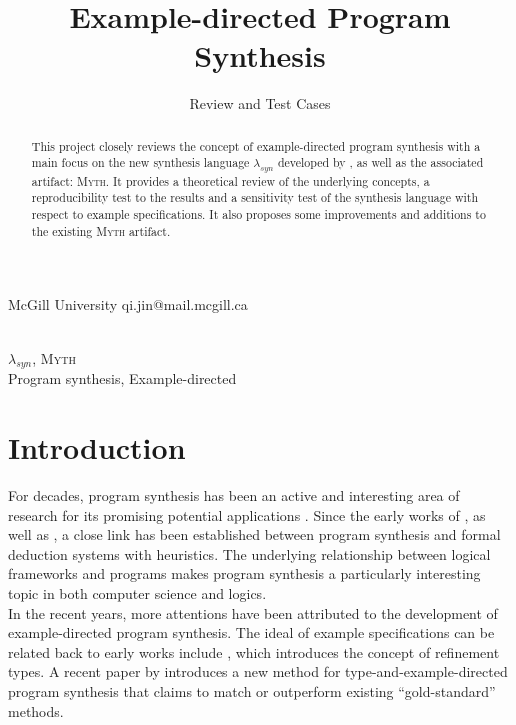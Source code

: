 \documentclass[preprint, 11pt]{sigplanconf}
\begin{document}
\setlength{\pdfpageheight}{\paperheight}
\setlength{\pdfpagewidth}{\paperwidth}



\title{Example-directed Program Synthesis}
\subtitle{Review and Test Cases}

           {McGill University}
           {qi.jin@mail.mcgill.ca}

\maketitle

\begin{abstract}
This project closely reviews the concept of example-directed program synthesis with a main focus on the new synthesis language $\lambda_{syn}$ developed by \citet{osera2015type}, as well as the associated artifact: \textsc{Myth}. It provides a theoretical review of the underlying concepts, a reproducibility test to the results and a sensitivity test of the synthesis language with respect to example specifications. It also proposes some improvements and additions to the existing \textsc{Myth} artifact.\end{abstract}\\

\terms
$\lambda_{syn}$, \textsc{Myth}\\

\keywords
Program synthesis, Example-directed\\

\section{Introduction}\label{sec-intr}

For decades, program synthesis has been an active and interesting area of research for its promising potential applications \cite{Basin2004}. Since the early works of \citet{green1969application}, as well as \citet{manna1971toward}, a close link has been established between program synthesis and formal deduction systems with heuristics. The underlying relationship between logical frameworks and programs makes program synthesis a particularly interesting topic in both computer science and logics. \\

In the recent years, more attentions have been attributed to the development of example-directed program synthesis. The ideal of example specifications can be related back to early works include \citet{freeman1991refinement}, which introduces the concept of refinement types. A recent paper by \citet{osera2015type} introduces a new method for type-and-example-directed program synthesis that claims to match or outperform existing “gold-standard” methods. \\
\end{document}
